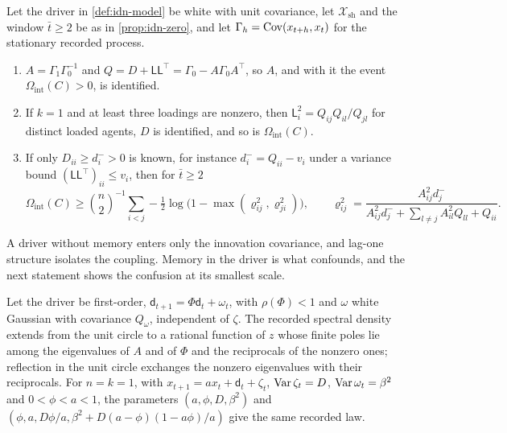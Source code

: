 \begin{proposition}\label{prop:idn-white}
Let the driver in \cref{def:idn-model} be white with unit covariance, let $\mathcal X_{\mathrm{sh}}$ and the window $\bar t\ge2$ be as in \cref{prop:idn-zero}, and let $\Gamma_h=\operatorname{Cov}(x_{t+h},x_t)$ for the stationary recorded process.
\begin{enumerate}
\item[(a)] $A=\Gamma_1\Gamma_0^{-1}$ and $Q=D+\mathsf L\mathsf L^{\top}=\Gamma_0-A\Gamma_0A^{\top}$, so $A$, and with it the event $\Omega_{\mathrm{int}}(C)>0$, is identified.
\item[(b)] If $k=1$ and at least three loadings are nonzero, then $\mathsf L_i^2=Q_{ij}Q_{il}/Q_{jl}$ for distinct loaded agents, $D$ is identified, and so is $\Omega_{\mathrm{int}}(C)$.
\item[(c)] If only $D_{ii}\ge d_i^->0$ is known, for instance $d_i^-=Q_{ii}-v_i$ under a variance bound $(\mathsf L\mathsf L^{\top})_{ii}\le v_i$, then for $\bar t\ge2$
\begin{equation}\label{eq:idn-bound}
\Omega_{\mathrm{int}}(C)\ge\binom n2^{-1}\sum_{i<j}-\tfrac12\log\bigl(1-\max(\varrho_{ij}^2,\varrho_{ji}^2)\bigr),\qquad\varrho_{ij}^2=\frac{A_{ij}^2d_j^-}{A_{ij}^2d_j^-+\sum_{l\neq j}A_{il}^2Q_{ll}+Q_{ii}}.
\end{equation}
\end{enumerate}
\end{proposition}

A driver without memory enters only the innovation covariance, and lag-one structure isolates the coupling. Memory in the driver is what confounds, and the next statement shows the confusion at its smallest scale.

\begin{proposition}\label{prop:idn-lag}
Let the driver be first-order, $\mathsf d_{t+1}=\Phi\mathsf d_t+\omega_t$, with $\rho(\Phi)<1$ and $\omega$ white Gaussian with covariance $Q_\omega$, independent of $\zeta$. The recorded spectral density extends from the unit circle to a rational function of $z$ whose finite poles lie among the eigenvalues of $A$ and of $\Phi$ and the reciprocals of the nonzero ones; reflection in the unit circle exchanges the nonzero eigenvalues with their reciprocals. For $n=k=1$, with $x_{t+1}=ax_t+\mathsf d_t+\zeta_t$, $\operatorname{Var}\zeta_t=D$, $\operatorname{Var}\omega_t=\beta^2$ and $0<\phi<a<1$, the parameters $(a,\phi,D,\beta^2)$ and $(\phi,a,D\phi/a,\beta^2+D(a-\phi)(1-a\phi)/a)$ give the same recorded law.
\end{proposition}

